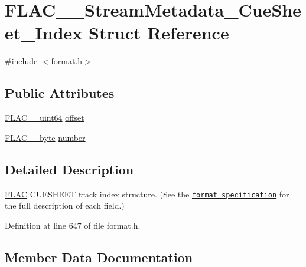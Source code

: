 \hypertarget{struct_f_l_a_c_____stream_metadata___cue_sheet___index}{}\section{F\+L\+A\+C\+\_\+\+\_\+\+Stream\+Metadata\+\_\+\+Cue\+Sheet\+\_\+\+Index Struct Reference}
\label{struct_f_l_a_c_____stream_metadata___cue_sheet___index}


{\ttfamily \#include $<$format.\+h$>$}

\subsection*{Public Attributes}
\begin{DoxyCompactItemize}
\item 
\hyperlink{ordinals_8h_aa78c8c70a3eb8a58af7436f278acde8e}{F\+L\+A\+C\+\_\+\+\_\+uint64} \hyperlink{struct_f_l_a_c_____stream_metadata___cue_sheet___index_ac221421bca83976925e2a41438157bb9}{offset}
\item 
\hyperlink{ordinals_8h_a5eb569b12d5b047cdacada4d57924ee3}{F\+L\+A\+C\+\_\+\+\_\+byte} \hyperlink{struct_f_l_a_c_____stream_metadata___cue_sheet___index_a71edc33c19a749f1dfb3d1429e08c77a}{number}
\end{DoxyCompactItemize}


\subsection{Detailed Description}
\hyperlink{namespace_f_l_a_c}{F\+L\+AC} C\+U\+E\+S\+H\+E\+ET track index structure. (See the \href{../format.html#cuesheet_track_index}{\tt format specification} for the full description of each field.) 

Definition at line 647 of file format.\+h.



\subsection{Member Data Documentation}
